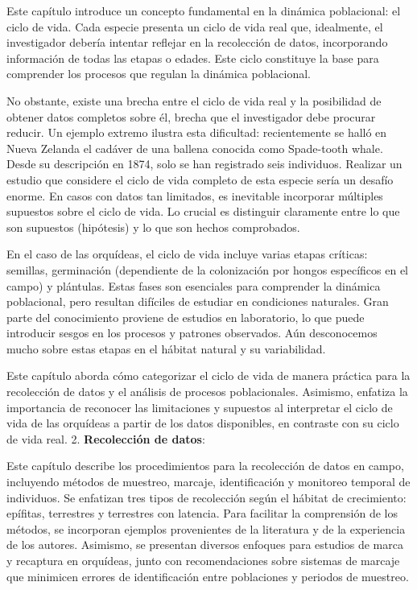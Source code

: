 \documentclass[
  12pt,
  letterpaper,
]{book}
\begin{document}
Este capítulo introduce un concepto fundamental en la dinámica
poblacional: el ciclo de vida. Cada especie presenta un ciclo de vida
real que, idealmente, el investigador debería intentar reflejar en la
recolección de datos, incorporando información de todas las etapas o
edades. Este ciclo constituye la base para comprender los procesos que
regulan la dinámica poblacional.

No obstante, existe una brecha entre el ciclo de vida real y la
posibilidad de obtener datos completos sobre él, brecha que el
investigador debe procurar reducir. Un ejemplo extremo ilustra esta
dificultad: recientemente se halló en Nueva Zelanda el cadáver de una
ballena conocida como Spade-tooth whale. Desde su descripción en 1874,
solo se han registrado seis individuos. Realizar un estudio que
considere el ciclo de vida completo de esta especie sería un desafío
enorme. En casos con datos tan limitados, es inevitable incorporar
múltiples supuestos sobre el ciclo de vida. Lo crucial es distinguir
claramente entre lo que son supuestos (hipótesis) y lo que son hechos
comprobados.

En el caso de las orquídeas, el ciclo de vida incluye varias etapas
críticas: semillas, germinación (dependiente de la colonización por
hongos específicos en el campo) y plántulas. Estas fases son esenciales
para comprender la dinámica poblacional, pero resultan difíciles de
estudiar en condiciones naturales. Gran parte del conocimiento proviene
de estudios en laboratorio, lo que puede introducir sesgos en los
procesos y patrones observados. Aún desconocemos mucho sobre estas
etapas en el hábitat natural y su variabilidad.

Este capítulo aborda cómo categorizar el ciclo de vida de manera
práctica para la recolección de datos y el análisis de procesos
poblacionales. Asimismo, enfatiza la importancia de reconocer las
limitaciones y supuestos al interpretar el ciclo de vida de las
orquídeas a partir de los datos disponibles, en contraste con su ciclo
de vida real. 2. \textbf{Recolección de datos}:

Este capítulo describe los procedimientos para la recolección de datos
en campo, incluyendo métodos de muestreo, marcaje, identificación y
monitoreo temporal de individuos. Se enfatizan tres tipos de recolección
según el hábitat de crecimiento: epífitas, terrestres y terrestres con
latencia. Para facilitar la comprensión de los métodos, se incorporan
ejemplos provenientes de la literatura y de la experiencia de los
autores. Asimismo, se presentan diversos enfoques para estudios de marca
y recaptura en orquídeas, junto con recomendaciones sobre sistemas de
marcaje que minimicen errores de identificación entre poblaciones y
periodos de muestreo.
\end{document}

